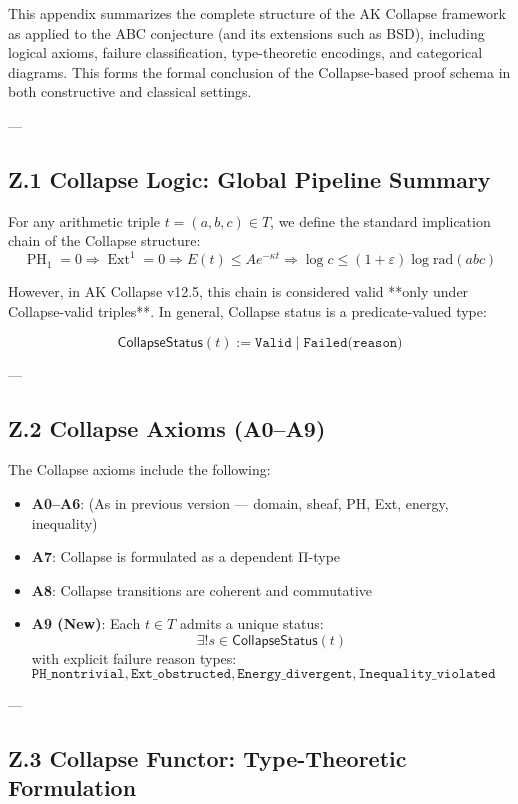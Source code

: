 \documentclass[11pt]{article}
\DeclareMathOperator{\Ext}{Ext}
\DeclareMathOperator{\PH}{PH}
\begin{document}
This appendix summarizes the complete structure of the AK Collapse framework as applied to the ABC conjecture  
(and its extensions such as BSD), including logical axioms, failure classification, type-theoretic encodings, and categorical diagrams.  
This forms the formal conclusion of the Collapse-based proof schema in both constructive and classical settings.

---

\subsection*{Z.1 Collapse Logic: Global Pipeline Summary}

For any arithmetic triple \( t = (a,b,c) \in T \), we define the standard implication chain of the Collapse structure:
\[
\boxed{
\PH_1 = 0 \Rightarrow \Ext^1 = 0 \Rightarrow E(t) \leq Ae^{-\kappa t} \Rightarrow \log c \leq (1+\varepsilon)\log \mathrm{rad}(abc)
}
\]

However, in AK Collapse v12.5, this chain is considered valid **only under Collapse-valid triples**.  
In general, Collapse status is a predicate-valued type:

\[
\mathsf{CollapseStatus}(t) := \texttt{Valid} \;|\; \texttt{Failed(reason)}
\]

---

\subsection*{Z.2 Collapse Axioms (A0–A9)}

The Collapse axioms include the following:

\begin{itemize}
  \item \textbf{A0–A6}: (As in previous version — domain, sheaf, PH, Ext, energy, inequality)
  \item \textbf{A7}: Collapse is formulated as a dependent Π-type
  \item \textbf{A8}: Collapse transitions are coherent and commutative
  \item \textbf{A9 (New)}: Each \( t \in T \) admits a unique status:  
  \[
  \exists! s \in \mathsf{CollapseStatus}(t)
  \]
  with explicit failure reason types:  
  \( \texttt{PH\_nontrivial}, \texttt{Ext\_obstructed}, \texttt{Energy\_divergent}, \texttt{Inequality\_violated} \)
\end{itemize}

---

\subsection*{Z.3 Collapse Functor: Type-Theoretic Formulation}
\end{document}
